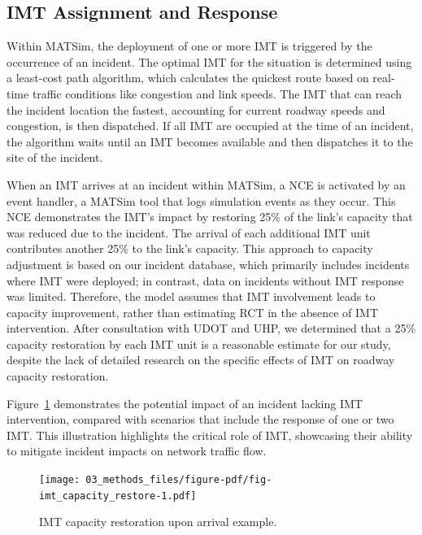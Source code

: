 \documentclass[fancy, oneside, mastersfancy, ms]{byuthesis}
\begin{document}
\hypertarget{sec-imt_response}{%
\subsection{IMT Assignment and Response}\label{sec-imt_response}}

Within MATSim, the deployment of one or more IMT is triggered by the
occurrence of an incident. The optimal IMT for the situation is
determined using a least-cost path algorithm, which calculates the
quickest route based on real-time traffic conditions like congestion and
link speeds. The IMT that can reach the incident location the fastest,
accounting for current roadway speeds and congestion, is then
dispatched. If all IMT are occupied at the time of an incident, the
algorithm waits until an IMT becomes available and then dispatches it to
the site of the incident.

When an IMT arrives at an incident within MATSim, a NCE is activated by
an event handler, a MATSim tool that logs simulation events as they
occur. This NCE demonstrates the IMT's impact by restoring 25\% of the
link's capacity that was reduced due to the incident. The arrival of
each additional IMT unit contributes another 25\% to the link's
capacity. This approach to capacity adjustment is based on our incident
database, which primarily includes incidents where IMT were deployed; in
contrast, data on incidents without IMT response was limited. Therefore,
the model assumes that IMT involvement leads to capacity improvement,
rather than estimating RCT in the absence of IMT intervention. After
consultation with UDOT and UHP, we determined that a 25\% capacity
restoration by each IMT unit is a reasonable estimate for our study,
despite the lack of detailed research on the specific effects of IMT on
roadway capacity restoration.

Figure~\ref{fig-imt_capacity_restore} demonstrates the potential impact
of an incident lacking IMT intervention, compared with scenarios that
include the response of one or two IMT. This illustration highlights the
critical role of IMT, showcasing their ability to mitigate incident
impacts on network traffic flow.

\begin{figure}

{\centering \texttt{[image: 03\_methods\_files/figure-pdf/fig-imt\_capacity\_restore-1.pdf]}

}

\caption{\label{fig-imt_capacity_restore}IMT capacity restoration upon
arrival example.}

\end{figure}
\end{document}
